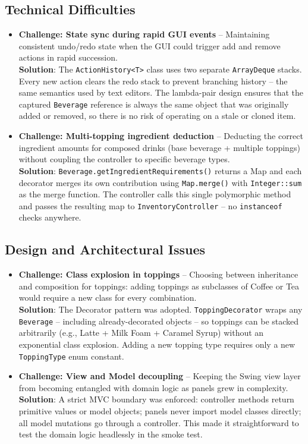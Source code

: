 \documentclass[11pt,a4paper]{article}
\begin{document}
\subsection{Technical Difficulties}
\begin{itemize}[leftmargin=*]
    \item \textbf{Challenge: State sync during rapid GUI events} -- Maintaining consistent undo/redo state when the GUI could trigger add and remove actions in rapid succession. \\
    \textbf{Solution}: The \texttt{ActionHistory<T>} class uses two separate \texttt{ArrayDeque} stacks. Every new action clears the redo stack to prevent branching history -- the same semantics used by text editors. The lambda-pair design ensures that the captured \texttt{Beverage} reference is always the same object that was originally added or removed, so there is no risk of operating on a stale or cloned item.
    \item \textbf{Challenge: Multi-topping ingredient deduction} -- Deducting the correct ingredient amounts for composed drinks (base beverage + multiple toppings) without coupling the controller to specific beverage types. \\
    \textbf{Solution}: \texttt{Beverage.getIngredientRequirements()} returns a Map and each decorator merges its own contribution using \texttt{Map.merge()} with \texttt{Integer::sum} as the merge function. The controller calls this single polymorphic method and passes the resulting map to \texttt{InventoryController} -- no \texttt{instanceof} checks anywhere.
\end{itemize}

\subsection{Design and Architectural Issues}
\begin{itemize}[leftmargin=*]
    \item \textbf{Challenge: Class explosion in toppings} -- Choosing between inheritance and composition for toppings: adding toppings as subclasses of Coffee or Tea would require a new class for every combination. \\
    \textbf{Solution}: The Decorator pattern was adopted. \texttt{ToppingDecorator} wraps any \texttt{Beverage} -- including already-decorated objects -- so toppings can be stacked arbitrarily (e.g., Latte + Milk Foam + Caramel Syrup) without an exponential class explosion. Adding a new topping type requires only a new \texttt{ToppingType} enum constant.
    \item \textbf{Challenge: View and Model decoupling} -- Keeping the Swing view layer from becoming entangled with domain logic as panels grew in complexity. \\
    \textbf{Solution}: A strict MVC boundary was enforced: controller methods return primitive values or model objects; panels never import model classes directly; all model mutations go through a controller. This made it straightforward to test the domain logic headlessly in the smoke test.
\end{itemize}
\end{document}
